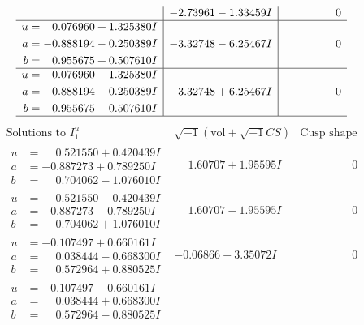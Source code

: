 \documentclass[1p]{elsarticle_modified}
\theoremstyle{definition}
\newcommand{\I}{\sqrt{-1}}
\begin{document}
$$\begin{array}{c|c|c}
 & -2.73961 - 1.33459 I & \phantom{-0.000000 } 0 \\ \hline\begin{aligned}
u &= \phantom{-}0.076960 + 1.325380 I \\
a &= -0.888194 - 0.250389 I \\
b &= \phantom{-}0.955675 + 0.507610 I\end{aligned}
 & -3.32748 - 6.25467 I & \phantom{-0.000000 } 0 \\ \hline\begin{aligned}
u &= \phantom{-}0.076960 - 1.325380 I \\
a &= -0.888194 + 0.250389 I \\
b &= \phantom{-}0.955675 - 0.507610 I\end{aligned}
 & -3.32748 + 6.25467 I & \phantom{-0.000000 } 0\\
 \hline 
 \end{array}$$\newpage$$\begin{array}{c|c|c}  
\text{Solutions to }I^u_{1}& \I (\text{vol} + \sqrt{-1}CS) & \text{Cusp shape}\\
 \hline 
\begin{aligned}
u &= \phantom{-}0.521550 + 0.420439 I \\
a &= -0.887273 + 0.789250 I \\
b &= \phantom{-}0.704062 - 1.076010 I\end{aligned}
 & \phantom{-}1.60707 + 1.95595 I & \phantom{-0.000000 } 0 \\ \hline\begin{aligned}
u &= \phantom{-}0.521550 - 0.420439 I \\
a &= -0.887273 - 0.789250 I \\
b &= \phantom{-}0.704062 + 1.076010 I\end{aligned}
 & \phantom{-}1.60707 - 1.95595 I & \phantom{-0.000000 } 0 \\ \hline\begin{aligned}
u &= -0.107497 + 0.660161 I \\
a &= \phantom{-}0.038444 - 0.668300 I \\
b &= \phantom{-}0.572964 + 0.880525 I\end{aligned}
 & -0.06866 - 3.35072 I & \phantom{-0.000000 } 0 \\ \hline\begin{aligned}
u &= -0.107497 - 0.660161 I \\
a &= \phantom{-}0.038444 + 0.668300 I \\
b &= \phantom{-}0.572964 - 0.880525 I\end{aligned}

\end{array}$$
\end{document}
